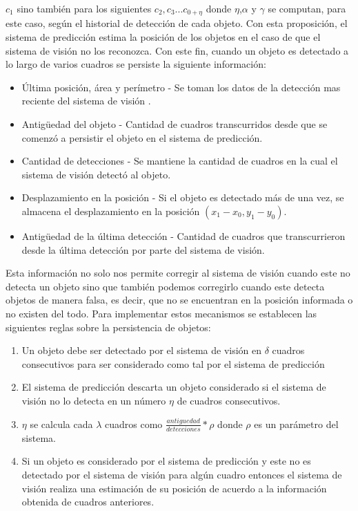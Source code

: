 $c_1$ sino también para los siguientes $c_2,c_3 ... c_{0+\eta}$ donde 
$\eta$,$\alpha$ y $\gamma$ se computan, para este caso, según el 
historial de detección de cada objeto.  Con esta proposición, el 
sistema de predicción estima la posición de los objetos en el caso de 
que el sistema de visión no los reconozca. Con este fin, cuando un objeto es detectado a lo largo de varios cuadros se persiste la siguiente información:
\begin{itemize}
\item{ Última posición, área y perímetro - Se toman los datos de la detección mas reciente del sistema de visión .}
\item{ Antigüedad del objeto - Cantidad de cuadros transcurridos desde que se comenzó a persistir el objeto en el sistema de predicción.}
\item{ Cantidad de detecciones - Se mantiene la cantidad de cuadros en la cual el sistema de visión detectó al objeto.}
\item{ Desplazamiento en la posición - Si el objeto es detectado más 
de una vez, se almacena el desplazamiento en la posición $(x_1 - x_0 , y_1 - y_0 )$.}
\item{ Antigüedad de la última detección - Cantidad de cuadros que transcurrieron desde la última detección por parte del sistema de visión.}  
\end{itemize}
Esta información no solo nos permite corregir al sistema de visión 
cuando este no detecta un objeto sino que también podemos corregirlo 
cuando este detecta objetos de manera falsa, es decir, que no se 
encuentran en la posición informada o no existen del todo. Para 
implementar estos mecanismos se establecen las siguientes reglas sobre 
la persistencia de objetos:
\begin{enumerate}
\item{Un objeto debe ser detectado por el sistema de visión en $\delta$ 
cuadros consecutivos para ser considerado como tal por el sistema de 
predicción}
\item{El sistema de predicción descarta un objeto considerado si el 
sistema de visión no lo detecta en un número $\eta$ de cuadros 
consecutivos.}
\item{ $\eta$ se calcula cada $\lambda$ cuadros como 
$\frac{antiguedad}{detecciones}*\rho$ donde $\rho$ es un parámetro del 
sistema}.
\item{ Si un objeto es considerado por el sistema de predicción y este 
no es detectado por el sistema de visión para algún cuadro entonces 
el sistema de visión realiza una estimación de su posición de 
acuerdo a la información obtenida de cuadros anteriores.}
\end{enumerate}

